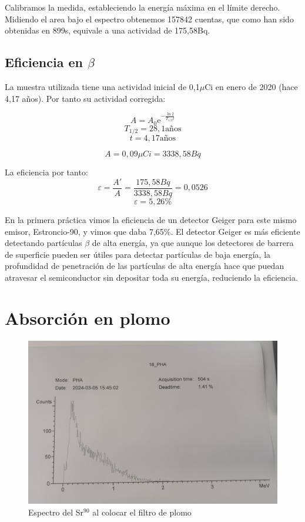 \documentclass[a4paper,12pt,spanish]{article}
\begin{document}
	
	Calibramos la medida, estableciendo la energía máxima en el límite derecho. \\
	
	Midiendo el area bajo el espectro obtenemos 157842 cuentas, que como han sido obtenidas en 899s, equivale a una actividad de 175,58Bq.
	
	\subsection*{Eficiencia en $\beta$}
	
	La muestra utilizada tiene una actividad inicial de 0,1$\mu$Ci en enero de 2020 (hace 4,17 años). Por tanto su actividad corregida:
	
	\[A = A_0 \text{e}^{-\frac{\ln 2}{T_{1/2} t}}\]
	\[T_{1/2}= 28,1\text{años}\]
	\[t = 4,17 \text{años}\]
	
	\[A = 0,09\si{\mu Ci} = 3338,58 \si{Bq}\]
	
	La eficiencia por tanto:
	\[ \varepsilon = \frac{A'}{A} = \frac{175,58\si{Bq}}{ 3338,58 \si{Bq}} = 0,0526 
	\]
	\[\varepsilon = 5,26\%
	\]
	
	En la primera práctica vimos la eficiencia de un detector Geiger para este mismo emisor, Estroncio-90, y vimos que daba 7,65\%. El detector Geiger es más eficiente detectando partículas $\beta$ de alta energía, ya que aunque los detectores de barrera de superficie pueden ser útiles para detectar partículas de baja energía, la profundidad de penetración de las partículas de alta energía hace que puedan atravesar el semiconductor sin depositar toda su energía, reduciendo la eficiencia.
	
	
	
	
	
	
	
	\section{Absorción en plomo}
	
\begin{figure}[H]
	\centering
	\includegraphics[width=0.7\linewidth]{"graficas recortadas/18"}
	\caption{Espectro del Sr$^{90}$ al colocar el filtro de plomo}
	\label{fig:18}
\end{figure}
	
\end{document}
